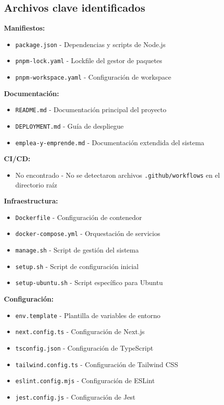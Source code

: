 \documentclass[12pt,a4paper]{article}
\begin{document}
\subsection{Archivos clave identificados}

\textbf{Manifiestos:}
\begin{itemize}
    \item \texttt{package.json} - Dependencias y scripts de Node.js
    \item \texttt{pnpm-lock.yaml} - Lockfile del gestor de paquetes
    \item \texttt{pnpm-workspace.yaml} - Configuración de workspace
\end{itemize}

\textbf{Documentación:}
\begin{itemize}
    \item \texttt{README.md} - Documentación principal del proyecto
    \item \texttt{DEPLOYMENT.md} - Guía de despliegue
    \item \texttt{emplea-y-emprende.md} - Documentación extendida del sistema
\end{itemize}

\textbf{CI/CD:}
\begin{itemize}
    \item No encontrado - No se detectaron archivos \texttt{.github/workflows} en el directorio raíz
\end{itemize}

\textbf{Infraestructura:}
\begin{itemize}
    \item \texttt{Dockerfile} - Configuración de contenedor
    \item \texttt{docker-compose.yml} - Orquestación de servicios
    \item \texttt{manage.sh} - Script de gestión del sistema
    \item \texttt{setup.sh} - Script de configuración inicial
    \item \texttt{setup-ubuntu.sh} - Script específico para Ubuntu
\end{itemize}

\textbf{Configuración:}
\begin{itemize}
    \item \texttt{env.template} - Plantilla de variables de entorno
    \item \texttt{next.config.ts} - Configuración de Next.js
    \item \texttt{tsconfig.json} - Configuración de TypeScript
    \item \texttt{tailwind.config.ts} - Configuración de Tailwind CSS
    \item \texttt{eslint.config.mjs} - Configuración de ESLint
    \item \texttt{jest.config.js} - Configuración de Jest
\end{itemize}
\end{document}
